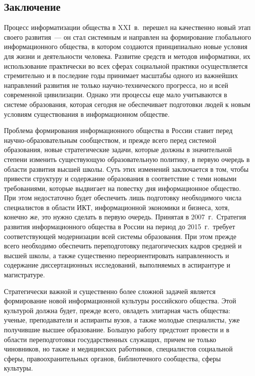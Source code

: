 \begin{multicols}{2}
\vspace*{-8.5pt}
\section{Заключение}

\vspace*{-3pt}

   Процесс информатизации общества в XXI~в.\ перешел на качественно новый этап
своего развития~--- он стал системным и направлен на формирование глобального
информационного общества, в котором создаются принципиально новые условия для
жизни и деятельности человека. Развитие средств и методов информатики, их
использование практически во всех сферах социальной практики осуществляется
стремительно и в последние годы принимает масштабы одного из важнейших
направлений развития не только научно-технического прогресса, но и всей современной
цивилизации. Однако эти процессы еще мало учитываются в сис\-те\-ме образования,
которая сегодня не обеспечивает подготовки людей к новым условиям существования в
информационном обществе.

   Проблема формирования информационного общества в России ставит перед
   научно-об\-ра\-зо\-ва\-тель\-ным сообществом, и прежде всего перед сис\-темой образования,
новые стратегические задачи, которые должны в значительной степени изменить
существующую образовательную политику, в первую очередь в области развития высшей
школы. Суть этих изменений заключается в том, чтобы привести структуру и содержание
образования в соответствие с теми новыми требованиями, которые выдвигает на повестку
дня информационное общество. При этом недостаточно будет обеспечить лишь
подготовку необходимого числа специалистов в области ИКТ, информационной
экономики и бизнеса, хотя, конечно же, это нужно сделать в первую очередь. Принятая в
2007~г.\ Стратегия развития информационного общества в России на период до 2015~г.\
требует соответствующей модернизации всей системы образования. При этом прежде
всего необходимо обеспечить переподготовку педагогических кадров средней и
высшей школы, а также существенно переориентировать направленность и содержание
диссертационных исследований, выполняемых в аспирантуре и магистратуре.

   Стратегически важной и существенно более сложной задачей является формирование
новой информационной культуры российского общества. Этой культурой должна будет,
прежде всего, овладеть элитарная часть общества: ученые, преподаватели и аспиранты
вузов, а также молодые специалисты, уже получившие высшее образование. Большую
работу предстоит провести и в области переподготовки государственных служащих,
причем не только чиновников, но также и медицинских работников, специалистов
социальной сферы, правоохранительных органов, библиотечного сообщества, сферы
культуры.


\end{multicols}
